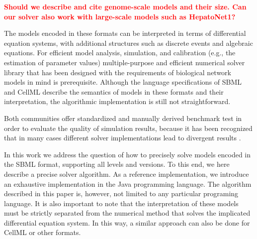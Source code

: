 \documentclass[10pt]{bmc_article}
\newenvironment{bmcformat}{\baselineskip20pt\sloppy\setboolean{publ}{false}}{\baselineskip20pt\sloppy}
\newcommand{\TODO}[1]{\textcolor{red}{\textbf{#1}}}
\begin{document}
\begin{bmcformat}
\TODO{Should we describe and cite genome-scale models and their size. Can our solver also
work with large-scale models such as HepatoNet1?}

The models encoded in these formats can be interpreted in terms of differential
equation systems, with additional structures such as discrete events and
algebraic equations. 
For efficient model analysis, simulation, and calibration (e.g.,
the estimation of parameter values) multiple-purpose and efficient numerical
solver library that has been designed with the requirements of biological
network models in mind is prerequisite.
Although the language specifications of SBML \cite{Hucka2001, Hucka2003,
Finney2003a, Finney2006, Hucka2007, Hucka2008, Hucka2010a} 
and CellML \cite{Cuellar2006} describe the semantics of models in these formats
and their interpretation, the algorithmic implementation is still not
straightforward.

Both communities offer standardized and manually derived benchmark test in order
to evaluate the quality of simulation results, because it has been recognized that in many cases
different solver implementations lead to divergent results \cite{Bergmann2008}.

In this work we address the question of how to precisely solve models encoded in
the SBML format, supporting all levels and versions. To this end, we here
describe a precise solver algorithm. As a reference implementation, we
introduce an exhaustive implementation in the Java\texttrademark{} programming
language. The algorithm described in this paper is, however, not limited to any
particular programing language. It is also important to note that the
interpretation of these models must be strictly separated from the numerical
method that solves the implicated differential equation system. In this way, a
similar approach can also be done for CellML or other formats.


\end{bmcformat}
\end{document}
